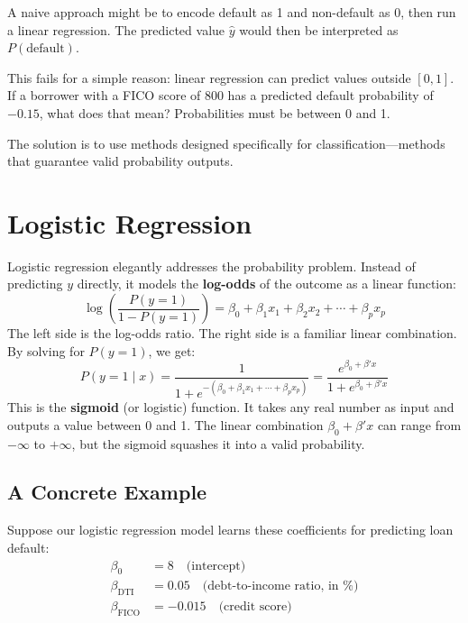 \documentclass[11pt,a4paper]{article}
\newcommand{\keyword}[1]{\textbf{\textcolor{AccentOrange}{#1}}}
\begin{document}
A naive approach might be to encode default as 1 and non-default as 0, then run a linear regression. The predicted value $\widehat{y}$ would then be interpreted as $P(\text{default})$.

This fails for a simple reason: linear regression can predict values outside $[0, 1]$. If a borrower with a FICO score of 800 has a predicted default probability of $-0.15$, what does that mean? Probabilities must be between 0 and 1.

The solution is to use methods designed specifically for classification---methods that guarantee valid probability outputs.

\section{Logistic Regression}

Logistic regression elegantly addresses the probability problem. Instead of predicting $y$ directly, it models the \keyword{log-odds} of the outcome as a linear function:
\[
\log\left(\frac{P(y=1)}{1-P(y=1)}\right) = \beta_0 + \beta_1 x_1 + \beta_2 x_2 + \cdots + \beta_p x_p
\]
The left side is the log-odds ratio. The right side is a familiar linear combination. By solving for $P(y=1)$, we get:
\[
P(y = 1 \mid x) = \frac{1}{1 + e^{-(\beta_0 + \beta_1 x_1 + \cdots + \beta_p x_p)}} = \frac{e^{\beta_0 + \beta' x}}{1 + e^{\beta_0 + \beta' x}}
\]
This is the \keyword{sigmoid} (or logistic) function. It takes any real number as input and outputs a value between 0 and 1. The linear combination $\beta_0 + \beta' x$ can range from $-\infty$ to $+\infty$, but the sigmoid squashes it into a valid probability.

\subsection{A Concrete Example}

Suppose our logistic regression model learns these coefficients for predicting loan default:
\begin{align*}
\beta_0 &= 8 \quad \text{(intercept)} \\
\beta_{\text{DTI}} &= 0.05 \quad \text{(debt-to-income ratio, in \%)} \\
\beta_{\text{FICO}} &= -0.015 \quad \text{(credit score)}
\end{align*}
\end{document}
